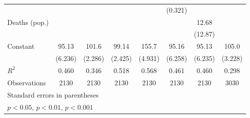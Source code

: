 \documentclass{article}
\begin{document}
{\begin{longtable}{l*{7}{c}}
                &                  &                  &                  &                  &  (0.321)         &                  &                  \\
Deaths (pop.)   &                  &                  &                  &                  &                  &    12.68         &                  \\
                &                  &                  &                  &                  &                  &  (12.87)         &                  \\
Constant        &    95.13\sym{***}&    101.6\sym{***}&    99.14\sym{***}&    155.7\sym{***}&    95.16\sym{***}&    95.13\sym{***}&    105.0\sym{***}\\
                &  (6.236)         &  (2.286)         &  (2.425)         &  (4.931)         &  (6.258)         &  (6.235)         &  (3.228)         \\
\hline
\(R^{2}\)       &    0.460         &    0.346         &    0.518         &    0.568         &    0.461         &    0.460         &    0.298         \\
Observations    &     2130         &     2130         &     2130         &     2130         &     2130         &     2130         &     3030         \\
\hline\hline
\multicolumn{8}{l}{\footnotesize Standard errors in parentheses}\\
\multicolumn{8}{l}{\footnotesize \sym{*} \(p<0.05\), \sym{**} \(p<0.01\), \sym{***} \(p<0.001\)}\\
\end{longtable}
}
\end{document}
